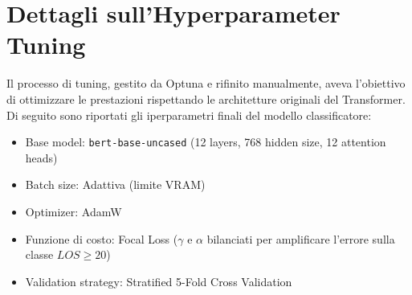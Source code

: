 \section{Dettagli sull'Hyperparameter Tuning}

Il processo di tuning, gestito da Optuna e rifinito manualmente, aveva l'obiettivo di ottimizzare le prestazioni rispettando le architetture originali del Transformer. Di seguito sono riportati gli iperparametri finali del modello classificatore:

\begin{itemize}
    \item Base model: \texttt{bert-base-uncased} (12 layers, 768 hidden size, 12 attention heads)
    \item Batch size: Adattiva (limite VRAM)
    \item Optimizer: AdamW
    \item Funzione di costo: Focal Loss ($\gamma$ e $\alpha$ bilanciati per amplificare l'errore sulla classe $LOS \ge 20$)
    \item Validation strategy: Stratified 5-Fold Cross Validation
\end{itemize}


